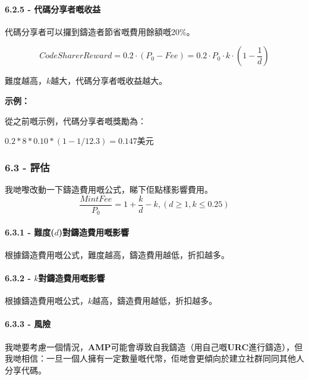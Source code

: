 \documentclass[
]{article}
\begin{document}
\paragraph{6.2.5 -
代碼分享者嘅收益}\label{ux4ee3ux78bcux5206ux4eabux8005ux5605ux6536ux76ca}

代碼分享者可以攞到鑄造者節省嘅費用餘額嘅20\%。

\begin{equation}
CodeSharerReward = 0.2 \cdot (P_0 - Fee) = 0.2 \cdot P_0 \cdot k \cdot (1 - \frac{1}{d})
\end{equation}

難度越高，\(k\)越大，代碼分享者嘅收益越大。

\textbf{示例：}

從之前嘅示例，代碼分享者嘅獎勵為：

\(0.2 * 8 * 0.10 * (1 - 1/12.3) = 0.147\)美元

\subsubsection{6.3 - 評估}\label{ux8a55ux4f30}

我哋嚟改動一下鑄造費用嘅公式，睇下佢點樣影響費用。 \begin{equation}
\frac{MintFee}{P_0} = 1 + \frac{k}{d} - k, (d \geq 1, k \leq 0.25)
\end{equation}

\paragraph{\texorpdfstring{6.3.1 -
難度(\(d\))對鑄造費用嘅影響}{6.3.1 - 難度(d)對鑄造費用嘅影響}}\label{ux96e3ux5ea6dux5c0dux9444ux9020ux8cbbux7528ux5605ux5f71ux97ff}

根據鑄造費用嘅公式，難度越高，鑄造費用越低，折扣越多。

\paragraph{\texorpdfstring{6.3.2 -
\(k\)對鑄造費用嘅影響}{6.3.2 - k對鑄造費用嘅影響}}\label{kux5c0dux9444ux9020ux8cbbux7528ux5605ux5f71ux97ff}

根據鑄造費用嘅公式，\(k\)越高，鑄造費用越低，折扣越多。

\paragraph{6.3.3 - 風險}\label{ux98a8ux96aa}

我哋要考慮一個情況，\textbf{AMP}可能會導致自我鑄造（用自己嘅\textbf{URC}進行鑄造），但我哋相信：一旦一個人擁有一定數量嘅代幣，佢哋會更傾向於建立社群同同其他人分享代碼。
\end{document}
